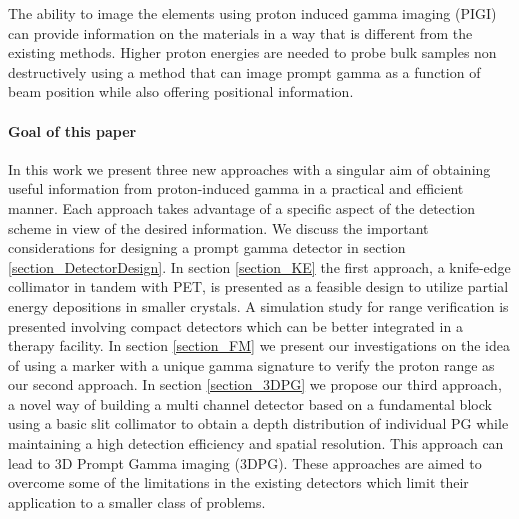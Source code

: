 \documentclass[11pt,a4paper]{article}
\begin{document}
The ability to image the elements using proton induced  gamma imaging (PIGI) can provide information on the materials in a way that is different from the existing methods. Higher proton energies are needed to probe bulk samples non destructively using a  method that can image prompt gamma as a function of beam position while also offering positional information. 





%






\paragraph{Goal of this paper}
In this work we present three new approaches with a singular aim of obtaining useful information from proton-induced gamma in a practical and efficient manner. Each approach takes advantage of a specific aspect of the detection scheme in view of the desired information. We discuss the important considerations for designing a prompt gamma detector in section \ref{section_DetectorDesign}. In section \ref{section_KE} the first approach, a knife-edge collimator in tandem with PET, is presented as a feasible design to utilize partial energy depositions in smaller crystals. A simulation study for range verification is presented involving compact detectors which can be better integrated in a therapy facility. In section \ref{section_FM} we present our investigations on the idea of using a marker with a unique gamma signature to verify the proton range as our second approach. In section \ref{section_3DPG} we propose our third approach, a novel way of building a multi channel detector based on a fundamental block using a basic slit collimator to obtain a depth distribution of individual PG while maintaining a high detection efficiency and spatial resolution. This approach can lead to 3D Prompt Gamma imaging (3DPG).
These approaches are aimed to overcome some of the limitations in the existing detectors which limit their application to a smaller class of problems. 
\end{document}
